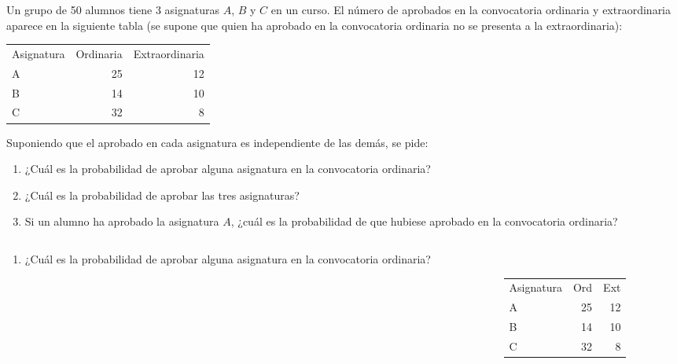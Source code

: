 \documentclass[aspectratio=149,10pt,xcolor=dvipsnames,t]{beamer}
\begin{document}
\begin{frame}[c]
\large
Un grupo de 50 alumnos tiene 3 asignaturas $A$, $B$ y $C$ en un curso. 
El número de aprobados en la convocatoria ordinaria y extraordinaria aparece en la siguiente tabla (se supone que quien
ha aprobado en la convocatoria ordinaria no se presenta a la extraordinaria):
\begin{center}
\begin{tabular}{lrr}
\hline
Asignatura & Ordinaria & Extraordinaria\\
A & 25 & 12\\
B & 14 & 10\\
C & 32 & 8\\
\hline
\end{tabular}
\end{center}
Suponiendo que el aprobado en cada asignatura es independiente de las demás, se pide:
\begin{enumerate}
\item ¿Cuál es la probabilidad de aprobar alguna asignatura en la convocatoria ordinaria?
\item ¿Cuál es la probabilidad de aprobar las tres asignaturas?
\item Si un alumno ha aprobado la asignatura $A$, ¿cuál es la probabilidad de que hubiese aprobado en la convocatoria ordinaria?
\end{enumerate}
\end{frame}


\begin{frame}
\begin{columns}
\begin{column}[T]{0.65\textwidth}
\begin{enumerate}
\item ¿Cuál es la probabilidad de aprobar alguna asignatura en la convocatoria ordinaria?
\end{enumerate}
\end{column}
\begin{column}[T]{0.35\textwidth}
\\

\medskip
\begin{tabular}{lrr}
\hline
Asignatura & Ord & Ext\\
A & 25 & 12\\
B & 14 & 10\\
C & 32 & 8\\
\hline
\end{tabular}
\end{column}
\end{columns}
\end{frame}
\end{document}
